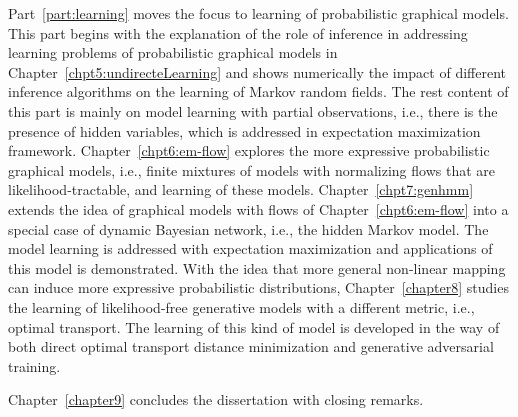 Part~\ref{part:learning} moves the focus to learning of probabilistic graphical models. This part begins with the explanation of the role of inference in addressing learning problems of probabilistic graphical models in Chapter~\ref{chpt5:undirecteLearning} and shows numerically the impact of different inference algorithms on the learning of Markov random fields. The rest content of this part is mainly on model learning with partial observations, i.e., there is the presence of hidden variables, which is addressed in expectation maximization framework. Chapter~\ref{chpt6:em-flow} explores the more expressive probabilistic graphical models, i.e., finite mixtures of models with normalizing flows that are likelihood-tractable, and learning of these models. Chapter~\ref{chpt7:genhmm} extends the idea of graphical models with flows of Chapter~\ref{chpt6:em-flow} into a special case of dynamic Bayesian network, i.e., the hidden Markov model. The model learning is addressed with expectation maximization and applications of this model is demonstrated. With the idea that more general non-linear mapping can induce more expressive probabilistic distributions, Chapter~\ref{chapter8} studies the learning of likelihood-free generative models with a different metric, i.e., optimal transport. The learning of this kind of model is developed in the way of both direct optimal transport distance minimization and generative adversarial training.

Chapter~\ref{chapter9} concludes the dissertation with closing remarks.
